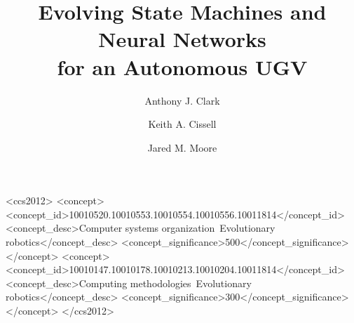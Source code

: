 \documentclass[sigconf,natbib=false,anonymous=true]{acmart}
\begin{document}
\title{Evolving State Machines and Neural Networks\\for an Autonomous UGV}

\author{Anthony J. Clark}


\author{Keith A. Cissell}


\author{Jared M. Moore}




%
%
\begin{CCSXML}
<ccs2012>
<concept>
<concept_id>10010520.10010553.10010554.10010556.10011814</concept_id>
<concept_desc>Computer systems organization~Evolutionary robotics</concept_desc>
<concept_significance>500</concept_significance>
</concept>
<concept>
<concept_id>10010147.10010178.10010213.10010204.10011814</concept_id>
<concept_desc>Computing methodologies~Evolutionary robotics</concept_desc>
<concept_significance>300</concept_significance>
</concept>
</ccs2012>
\end{CCSXML}



\maketitle








\printbibliography
\end{document}
